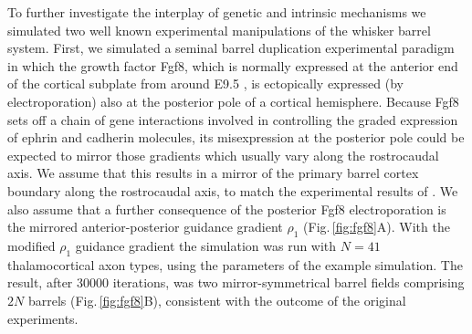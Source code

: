 \documentclass[9pt,lineno]{elife}
\newcommand{\MPthreePred}[1]{\textcolor{colmpthreepred}{#1}}
\begin{document}
\MPthreePred{To further investigate the interplay of genetic and intrinsic
  mechanisms we simulated two well known experimental manipulations of the
  whisker barrel system. First, we simulated a seminal barrel duplication
  experimental paradigm}
\citep{shimogori_fibroblast_2005,assimacopoulos_fibroblast_2012}
\MPthreePred{in which the growth factor Fgf8, which is normally expressed at
  the anterior end of the cortical subplate from around E9.5}
\citep{crossley_mouse_1995}, \MPthreePred{is ectopically expressed (by
  electroporation) also at the posterior pole of a cortical
  hemisphere. Because Fgf8 sets off a chain of gene interactions involved in
  controlling the graded expression of ephrin and cadherin molecules, its
  misexpression at the posterior pole could be expected to mirror those
  gradients which usually vary along the rostrocaudal axis. We assume that
  this results in a mirror of the primary barrel cortex boundary along the
  rostrocaudal axis, to match the experimental results of}
\cite{assimacopoulos_fibroblast_2012}. \MPthreePred{We also assume that a
  further consequence of the posterior Fgf8 electroporation is the mirrored
  anterior-posterior guidance gradient $\rho_1$ (Fig.\,\ref{fig:fgf8}A). With
  the modified $\rho_1$ guidance gradient the simulation was run with $N=41$
  thalamocortical axon types, using the parameters of the example
  simulation. The result, after 30000 iterations, was two mirror-symmetrical
  barrel fields comprising $2N$ barrels (Fig.\,\ref{fig:fgf8}B), consistent
  with the outcome of the original experiments.}
\end{document}
